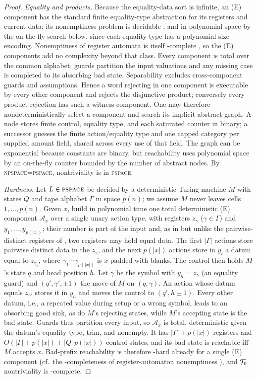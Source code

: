 \begin{proof}
\emph{Equality and products.} Because the equality-data sort is infinite, an
(E) component has the standard finite equality-type abstraction for its
registers and current data; its nonemptiness problem is
decidable \citep{kaminski1994finite}, and in polynomial space by the on-the-fly search below, since each equality type has a polynomial-size encoding. Nonemptiness of register automata is itself \PSPACE-complete \citep{demri2009ltl}, so the (E) components add no complexity beyond that class. Every component is
total over the common alphabet: guards partition the input valuations and any
missing case is completed to its absorbing bad state. Separability excludes
cross-component guards and assumptions. Hence a word rejecting in one
component is executable by every other component and rejects the disjunctive
product; conversely every product rejection has such a witness component.
One may therefore nondeterministically select a component and search its
implicit abstract graph. A node stores finite control, equality type, and each
saturated counter in binary; a successor guesses the finite action/equality
type and one capped category per supplied amount field, shared across every
use of that field. The graph can be exponential
because constants are binary, but reachability uses polynomial space by an
on-the-fly counter bounded by the number of abstract nodes. By
\textsc{npspace}=\textsc{pspace}, nontriviality is in \textsc{pspace}.

\emph{Hardness.} Let $L\in\textsc{pspace}$ be decided by a deterministic Turing machine $M$ with states
$Q$ and tape alphabet $\Gamma$ in space $p(n)$; we assume $M$ never leaves cells $1,\ldots,p(n)$.
Given $x$, build in polynomial time one total deterministic (E) component $\mathcal A_x$ over a
single unary action type, with registers $z_\gamma$ ($\gamma\in\Gamma$) and $y_1,\ldots,y_{p(|x|)}$; their number is part of the input and, as in \citet{demri2009ltl} but unlike the pairwise-distinct registers of \citet{kaminski1994finite}, two registers may hold equal data.
The first $|\Gamma|$ actions store pairwise distinct data in the $z_\gamma$, and the next $p(|x|)$
actions store in $y_i$ a datum equal to $z_{\gamma_i}$, where $\gamma_1\cdots\gamma_{p(|x|)}$ is $x$
padded with blanks. The control then holds $M$'s state $q$ and head position $h$. Let $\gamma$ be
the symbol with $y_h=z_\gamma$ (an equality guard) and $(q',\gamma',\pm1)$ the move of $M$ on
$(q,\gamma)$. An action whose datum equals $z_{\gamma'}$ stores it in $y_h$ and moves the control to
$(q',h\pm1)$. Every other datum, i.e., a repeated value during setup or a wrong symbol, leads to an
absorbing good sink, as do $M$'s rejecting states, while $M$'s accepting state is the bad state.
Guards thus partition every input, so $\mathcal A_x$ is total, deterministic given the datum's
equality type, trim, and nonempty. It has $|\Gamma|+p(|x|)$ registers and
$O(|\Gamma|+p(|x|)+|Q|\,p(|x|))$ control states, and its bad state is reachable iff $M$ accepts $x$.
Bad-prefix reachability is therefore \PSPACE-hard already for a single (E) component (cf.\ the
\PSPACE-completeness of register-automaton nonemptiness \citep{demri2009ltl}), and $\mathcal{T}_0$
nontriviality is \PSPACE-complete.


\end{proof}
